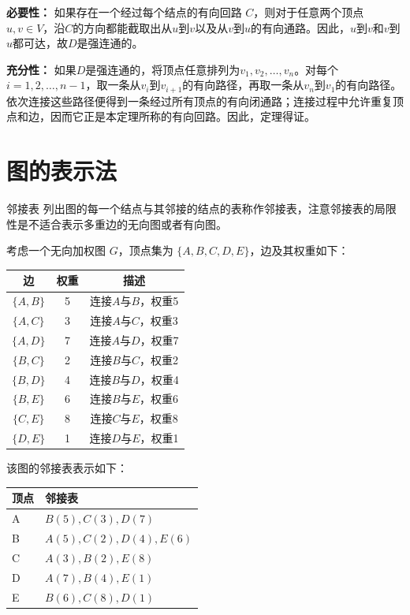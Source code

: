 \documentclass[lang=cn,11pt]{elegantbook}
\begin{document}
\textbf{必要性：} 如果存在一个经过每个结点的有向回路 $C$，则对于任意两个顶点 $u, v \in V$，沿$C$的方向都能截取出从$u$到$v$以及从$v$到$u$的有向通路。因此，$u$到$v$和$v$到$u$都可达，故$D$是强连通的。

\textbf{充分性：} 如果$D$是强连通的，将顶点任意排列为$v_1,v_2,\ldots,v_n$。对每个$i=1,2,\ldots,n-1$，取一条从$v_i$到$v_{i+1}$的有向路径，再取一条从$v_n$到$v_1$的有向路径。依次连接这些路径便得到一条经过所有顶点的有向闭通路；连接过程中允许重复顶点和边，因而它正是本定理所称的有向回路。因此，定理得证。

\section{图的表示法}
\begin{definition}{邻接表}
    列出图的每一个结点与其邻接的结点的表称作邻接表，注意邻接表的局限性是不适合表示多重边的无向图或者有向图。
\end{definition}
考虑一个无向加权图 $G$，顶点集为 $\{A, B, C, D, E\}$，边及其权重如下：
\begin{center}
\begin{tabular}{c|c|c}
边 & 权重 & 描述 \\
\hline
$\{A,B\}$ & 5 & 连接$A$与$B$，权重5 \\
$\{A,C\}$ & 3 & 连接$A$与$C$，权重3 \\
$\{A,D\}$ & 7 & 连接$A$与$D$，权重7 \\
$\{B,C\}$ & 2 & 连接$B$与$C$，权重2 \\
$\{B,D\}$ & 4 & 连接$B$与$D$，权重4 \\
$\{B,E\}$ & 6 & 连接$B$与$E$，权重6 \\
$\{C,E\}$ & 8 & 连接$C$与$E$，权重8 \\
$\{D,E\}$ & 1 & 连接$D$与$E$，权重1 \\
\end{tabular}
\end{center}
该图的邻接表表示如下：
\begin{center}
\begin{tabular}{l|l}
顶点 & 邻接表 \\
\hline
A & $B(5) , C(3) , D(7)$ \\
B & $A(5) , C(2) , D(4) , E(6)$ \\
C & $A(3) , B(2) , E(8)$ \\
D & $A(7) , B(4) , E(1)$ \\
E & $B(6) , C(8) , D(1)$ \\
\end{tabular}
\end{center}
\end{document}
